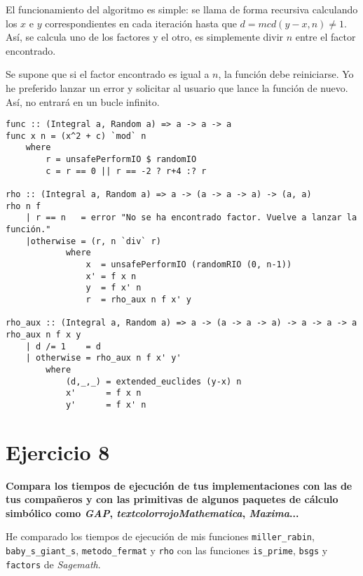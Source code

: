 \documentclass[10pt,spanish]{article}
\begin{document}
El funcionamiento del algoritmo es simple: se llama de forma recursiva calculando los $x$ e $y$ correspondientes en cada iteración hasta que $d = mcd(y - x, n) \neq 1$. Así, se calcula uno de los factores y el otro, es simplemente divir $n$ entre el factor encontrado.

Se supone que si el factor encontrado es igual a $n$, la función debe reiniciarse. Yo he preferido lanzar un error y solicitar al usuario que lance la función de nuevo. Así, no entrará en un bucle infinito.

\begin{verbatim}
func :: (Integral a, Random a) => a -> a -> a
func x n = (x^2 + c) `mod` n
    where
        r = unsafePerformIO $ randomIO
        c = r == 0 || r == -2 ? r+4 :? r

rho :: (Integral a, Random a) => a -> (a -> a -> a) -> (a, a)
rho n f
    | r == n   = error "No se ha encontrado factor. Vuelve a lanzar la función."
    |otherwise = (r, n `div` r)
            where
                x  = unsafePerformIO (randomRIO (0, n-1))
                x' = f x n 
                y  = f x' n
                r  = rho_aux n f x' y

rho_aux :: (Integral a, Random a) => a -> (a -> a -> a) -> a -> a -> a
rho_aux n f x y
    | d /= 1    = d
    | otherwise = rho_aux n f x' y'
        where
            (d,_,_) = extended_euclides (y-x) n
            x'      = f x n
            y'      = f x' n
\end{verbatim}

\section{\textcolor{rojo}Ejercicio 8}
\textbf{Compara los tiempos de ejecución de tus implementaciones con las de tus compañeros y con las primitivas de algunos paquetes de cálculo simbólico como \textit{\textcolor{rojo}{GAP}}, \textit{textcolor{rojo}{Mathematica}}, \textcolor{rojo}{\textit{Maxima}}...}

He comparado los tiempos de ejecución de mis funciones \texttt{miller\_rabin}, \texttt{baby\_s\_giant\_s}, \texttt{metodo\_fermat} y \texttt{rho} con las funciones \texttt{is\_prime}, \texttt{bsgs} y \texttt{factors} de \textit{\textcolor{rojo}{Sagemath}}.
\end{document}
